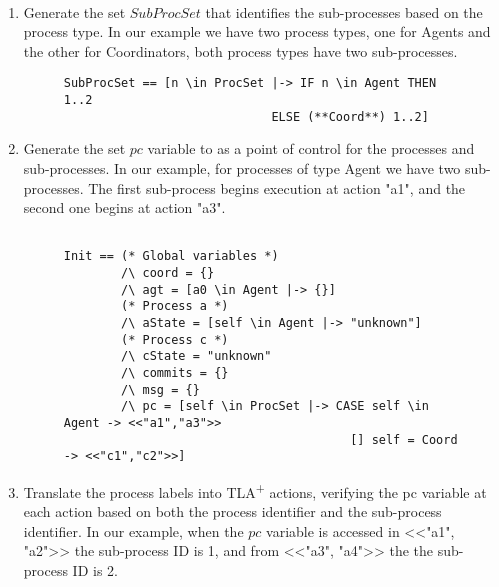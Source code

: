 \documentclass{thesul}
\newcommand{\tlaplus}{TLA\textsuperscript{+}\xspace}
\begin{document}
\hfill\\
\begin{enumerate}

\item Generate the set $SubProcSet$ that identifies the sub-processes based on the process type.
In our example we have two process types, one for Agents and the other for Coordinators, both process types have two sub-processes.

\FloatBarrier
\begin{figure}[!h]
\label{2pcSubTla}
\begin{lstlisting}[caption = Distributed PlusCal Translation- SubProcSet, frame = tlrb, firstnumber = 1]
SubProcSet == [n \in ProcSet |-> IF n \in Agent THEN 1..2
                             ELSE (**Coord**) 1..2]

\end{lstlisting}
\end{figure}
\FloatBarrier

\item Generate the set $pc$ variable to as a point of control for the processes and sub-processes.
In our example, for processes of type Agent we have two sub-processes. The first sub-process begins execution at action "a1", and the second one begins at action "a3".
\hfill\\

\FloatBarrier
\begin{figure}[!h]
\begin{lstlisting}[caption = TLA+ translation for Sub-Processes, frame = tlrb, firstnumber = 1]

Init == (* Global variables *)
        /\ coord = {}
        /\ agt = [a0 \in Agent |-> {}]
        (* Process a *)
        /\ aState = [self \in Agent |-> "unknown"]
        (* Process c *)
        /\ cState = "unknown"
        /\ commits = {}
        /\ msg = {}
        /\ pc = [self \in ProcSet |-> CASE self \in Agent -> <<"a1","a3">>
                                        [] self = Coord -> <<"c1","c2">>]
\end{lstlisting}
\end{figure}
\FloatBarrier

\item Translate the process labels into \tlaplus actions, verifying the pc variable at each action based on both the process identifier and the sub-process identifier.
In our example, when the $pc$ variable is accessed in <<"a1", "a2">> the sub-process ID is 1, and from <<"a3", "a4">> the the sub-process ID is 2.


\end{enumerate}
\end{document}
